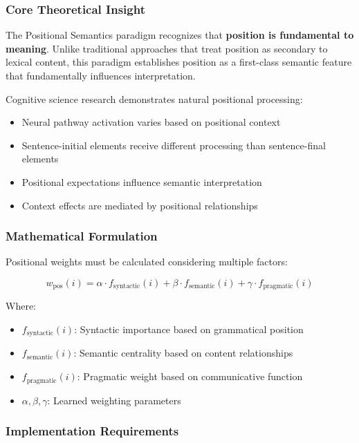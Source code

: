 \documentclass[12pt,a4paper,twoside]{article}
\begin{document}
\subsubsection{Core Theoretical Insight}

The Positional Semantics paradigm recognizes that \textbf{position is fundamental to meaning}. Unlike traditional approaches that treat position as secondary to lexical content, this paradigm establishes position as a first-class semantic feature that fundamentally influences interpretation.

Cognitive science research demonstrates natural positional processing:
\begin{itemize}
\item Neural pathway activation varies based on positional context
\item Sentence-initial elements receive different processing than sentence-final elements
\item Positional expectations influence semantic interpretation
\item Context effects are mediated by positional relationships
\end{itemize}

\subsubsection{Mathematical Formulation}

Positional weights must be calculated considering multiple factors:

\begin{equation}
w_{\text{pos}}(i) = \alpha \cdot f_{\text{syntactic}}(i) + \beta \cdot f_{\text{semantic}}(i) + \gamma \cdot f_{\text{pragmatic}}(i)
\end{equation}

Where:
\begin{itemize}
\item $f_{\text{syntactic}}(i)$: Syntactic importance based on grammatical position
\item $f_{\text{semantic}}(i)$: Semantic centrality based on content relationships
\item $f_{\text{pragmatic}}(i)$: Pragmatic weight based on communicative function
\item $\alpha, \beta, \gamma$: Learned weighting parameters
\end{itemize}

\subsubsection{Implementation Requirements}
\end{document}
